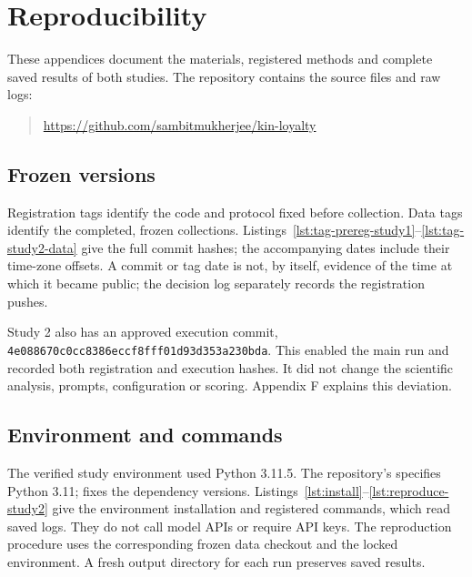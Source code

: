 \appendix
{}
\section{Reproducibility}
\label{app:reproducibility}
These appendices document the materials, registered methods and complete saved results of both studies. The repository contains the source files and raw logs:
\begin{quote}
\url{https://github.com/sambitmukherjee/kin-loyalty}
\end{quote}

\subsection{Frozen versions}
\label{subapp:frozen-versions}
Registration tags identify the code and protocol fixed before collection. Data tags identify the completed, frozen collections. Listings~\ref{lst:tag-prereg-study1}--\ref{lst:tag-study2-data} give the full commit hashes; the accompanying dates include their time-zone offsets. A commit or tag date is not, by itself, evidence of the time at which it became public; the decision log separately records the registration pushes.


Study 2 also has an approved execution commit, \lstinline!4e088670c0cc8386eccf8fff01d93d353a230bda!. This enabled the main run and recorded both registration and execution hashes. It did not change the scientific analysis, prompts, configuration or scoring. Appendix F explains this deviation.

\subsection{Environment and commands}
\label{subapp:environment-and-commands}
The verified study environment used Python 3.11.5. The repository's  specifies Python 3.11;  fixes the dependency versions. Listings~\ref{lst:install}--\ref{lst:reproduce-study2} give the environment installation and registered commands, which read saved logs. They do not call model APIs or require API keys. The reproduction procedure uses the corresponding frozen data checkout and the locked environment. A fresh output directory for each run preserves saved results.

